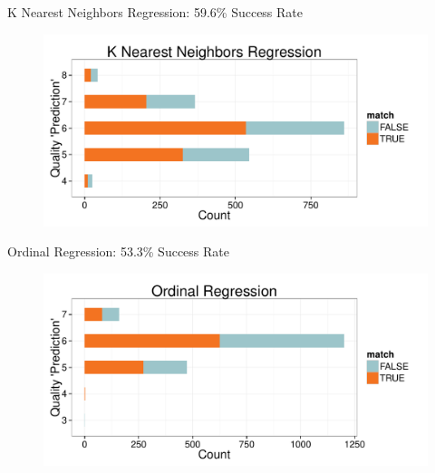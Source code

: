 \documentclass{beamer}
\begin{document}
\begin{frame}{K Nearest Neighbors Regression: 59.6\% Success Rate}
	\begin{figure}
		\centering
		\includegraphics[width=\textwidth]{../images/KNNRegression_Results.pdf}
	\end{figure}

\end{frame}


\begin{frame}{Ordinal Regression: 53.3\% Success Rate}
	\begin{figure}
		\centering
		\includegraphics[width=\textwidth]{../images/OrdinalRegression_Results.pdf}
	\end{figure}

\end{frame}
\end{document}
